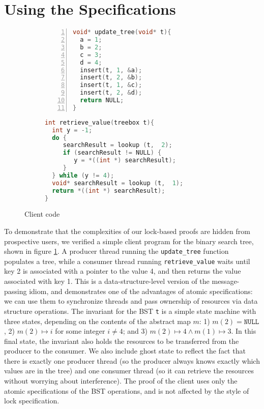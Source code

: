 \documentclass[runningheads]{llncs}
\begin{document}
\section{Using the Specifications}
\begin{figure}[t]%
\begin{subfigure}[t]{0.4\textwidth}
\begin{lstlisting}[language = C, basicstyle=\small\ttfamily, numbers=left]
void* update_tree(void* t){
  a = 1;
  b = 2;
  c = 3; 
  d = 4;
  insert(t, 1, &a);
  insert(t, 2, &b);
  insert(t, 1, &c);
  insert(t, 2, &d);
  return NULL;
}
\end{lstlisting} 
\end{subfigure}\qquad
\begin{subfigure}[t]{0.55\textwidth}
 \begin{lstlisting}[language = C, basicstyle=\small\ttfamily]
int retrieve_value(treebox t){
  int y = -1;
  do {
     searchResult = lookup (t,  2);
     if (searchResult != NULL) {
        y = *((int *) searchResult);
     }
  } while (y != 4);
  void* searchResult = lookup (t,  1);
  return *((int *) searchResult);
}
\end{lstlisting}
\end{subfigure}
\caption{Client code}
\label{bst-conc-client}
\end{figure}
To demonstrate that the complexities of our lock-based proofs are hidden from prospective users, we verified a simple client program for the binary search tree, shown in figure \ref{bst-conc-client}. A producer thread running the \lstinline{update_tree} function populates a tree, while a consumer thread running \lstinline{retrieve_value} waits until key 2 is associated with a pointer to the value 4, and then returns the value associated with key 1. This is a data-structure-level version of the message-passing idiom, and demonstrates one of the advantages of atomic specifications: we can use them to synchronize threads and pass ownership of resources via data structure operations. The invariant for the BST \lstinline{t} is a simple state machine with three states, depending on the contents of the abstract map $m$: 1) $m(2) = \texttt{NULL}$, 2) $m(2) \mapsto i$ for some integer $i \neq 4$; and 3) $m(2) \mapsto 4 \land m(1) \mapsto 3$. In this final state, the invariant also holds the resources to be transferred from the producer to the consumer. We also include ghost state to reflect the fact that there is exactly one producer thread (so the producer always knows exactly which values are in the tree) and one consumer thread (so it can retrieve the resources without worrying about interference). The proof of the client uses only the atomic specifications of the BST operations, and is not affected by the style of lock specification.
\end{document}
